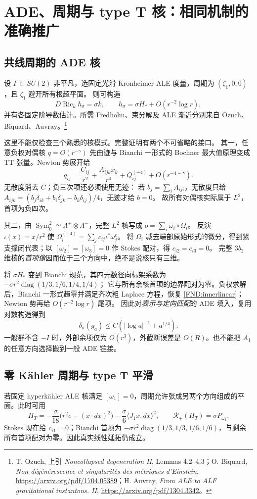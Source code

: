 \documentclass[UTF8,fontset=fandol,zihao=-4,oneside,openany]{ctexbook}
\theoremstyle{cjkplain}
\numberwithin{equation}{chapter}
\DeclareMathOperator{\Ric}{Ric}
\begin{document}
\section{ADE、周期与 type T 核：相同机制的准确推广}
\subsection{共线周期的 ADE 核}
设 \(\Gamma\subset SU(2)\) 非平凡，选固定光滑 Kronheimer ALE 度量，周期为
\((\zeta_1,0,0)\)，且 \(\zeta_1\) 避开所有根超平面。
则可构造
\[
D\Ric_k h_\sigma=\sigma k,\qquad
h_\sigma=\sigma H_*+O(r^{-2}\log r),
\]
并有各固定阶导数估计。所需 Fredholm、束分解及 ALE 渐近分别来自 Ozuch、Biquard、Auvray。\footnote{T. Ozuch, 上引 \emph{Noncollapsed degeneration II}, Lemmas 4.2--4.3；O. Biquard, \emph{Non dégénérescence et singularités des métriques d'Einstein}, \url{https://arxiv.org/pdf/1704.05389}；H. Auvray, \emph{From ALE to ALF gravitational instantons. II}, \url{https://arxiv.org/pdf/1304.3342}。}

这里不能仅检查三个熟悉的核模式。完整证明有两个不可省略的接口。
其一，任意负权对偶核 \(q=O(r^{-\gamma})\) 先由迹与 Bianchi 一形式的 Bochner 最大值原理变成 TT 张量。Newton 势展开给
\[
q_{ij}=\frac{C_{ij}}{r^2}
+\frac{A_{ijk}x_k}{r^4}+Q_{ij}^{(-4)}
+O(r^{-4-\gamma}).
\]
无散度消去 \(C\)；负三次项还必须使用无迹：
若 \(b_j=\sum_iA_{iji}\)，无散度只给
\(A_{ijk}=(b_j\delta_{ik}+b_i\delta_{jk}-b_k\delta_{ij})/4\)，无迹才给 \(b=0\)。
故所有对偶核实际属于 \(L^2\)，首项为负四次。

其二，由
\(\operatorname{Sym}^2_0\simeq\Lambda^+\otimes\Lambda^-\)，完整 \(L^2\) 核写成
\(o=\sum_i\omega_i\circ\Omega_i\)。
反演 \(\iota(x)=x/r^2\) 使
\(\Omega_i^{(-4)}=\sum_jc_{ij}\iota^*\omega_j^e\)。
将 \(\Omega_i\) 减去端部原始形式的微分，得到紧支撑闭代表；以
\([\omega_2]=[\omega_3]=0\) 作 Stokes 配对，得 \(c_{i2}=c_{i3}=0\)。
完整 \(3b_2\) 维核的\emph{首项像}因而位于三个方向中，绝不是说核只有三维。

将 \(\sigma H_*\) 变到 Bianchi 规范，其四元数径向标架系数为
\(-\sigma r^2\operatorname{diag}(1/3,1/6,1/4,1/4)\)；
它与所有余核首项的边界配对为零。负权求解后，Bianchi 一形式趋零并满足齐次粗 Laplace 方程，恢复 \eqref{FND:innerlinear}；Newton 势再给 \(O(r^{-2}\log r)\) 尾项。
因此对\emph{表示与定向匹配}的 ADE 填入，复用对数构造得到
\[
\delta_\sigma(g_a)\le C(|\log a|^{-1}+a^{1/4}).
\]
一般群不含 \(-I\) 时，外部余项仅为 \(O(r^3)\)，外截断误差是 \(O(R)\)。也不能把 \(A_1\) 的任意方向选择搬到一般 ADE 链接。

\subsection{零 Kähler 周期与 type T 平滑}
若固定 hyperkähler ALE 核满足 \([\omega_1]=0\)，周期允许张成另两个方向组成的平面。此时可用
\[
H_T=-\frac{\sigma}{18}\bigl(r^2e-(x\cdot dx)^2\bigr)
-\frac{\sigma}{6}\langle J_1x,dx\rangle^2,\qquad
\mathcal R_+(H_T)=\sigma P_{\omega_1}.
\]
Stokes 现在给 \(c_{i1}=0\)；Bianchi 首项为
\(-\sigma r^2\operatorname{diag}(1/3,1/3,1/6,1/6)\)，与剩余所有首项配对为零。因此真实线性延拓仍成立。
\end{document}
